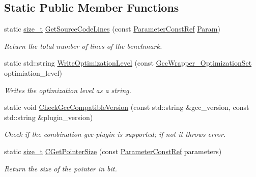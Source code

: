 \subsection*{Static Public Member Functions}
\begin{DoxyCompactItemize}
\item 
static \hyperlink{tutorial__fpt__2017_2intro_2sixth_2test_8c_a7c94ea6f8948649f8d181ae55911eeaf}{size\+\_\+t} \hyperlink{classGccWrapper_aaea934b26fbfbd9e8ff802b9efc87b7f}{Get\+Source\+Code\+Lines} (const \hyperlink{Parameter_8hpp_a37841774a6fcb479b597fdf8955eb4ea}{Parameter\+Const\+Ref} \hyperlink{classGccWrapper_ae052c2164d449f57b725ab2d2fc41779}{Param})
\begin{DoxyCompactList}\small\item\em Return the total number of lines of the benchmark. \end{DoxyCompactList}\item 
static std\+::string \hyperlink{classGccWrapper_a5df0314ce8643d1216b6981a333dc385}{Write\+Optimization\+Level} (const \hyperlink{gcc__wrapper_8hpp_a0f57d29a8e8442ddf6d2cd8577c6788d}{Gcc\+Wrapper\+\_\+\+Optimization\+Set} optimiation\+\_\+level)
\begin{DoxyCompactList}\small\item\em Writes the optimization level as a string. \end{DoxyCompactList}\item 
static void \hyperlink{classGccWrapper_ac7ff70c47c923a35ae9820b32b2e9e44}{Check\+Gcc\+Compatible\+Version} (const std\+::string \&gcc\+\_\+version, const std\+::string \&plugin\+\_\+version)
\begin{DoxyCompactList}\small\item\em Check if the combination gcc-\/plugin is supported; if not it throws error. \end{DoxyCompactList}\item 
static \hyperlink{tutorial__fpt__2017_2intro_2sixth_2test_8c_a7c94ea6f8948649f8d181ae55911eeaf}{size\+\_\+t} \hyperlink{classGccWrapper_abc1a0fb1d8c8bd5d9cac9ac120a8f2b2}{C\+Get\+Pointer\+Size} (const \hyperlink{Parameter_8hpp_a37841774a6fcb479b597fdf8955eb4ea}{Parameter\+Const\+Ref} parameters)
\begin{DoxyCompactList}\small\item\em Return the size of the pointer in bit. \end{DoxyCompactList}\end{DoxyCompactItemize}
